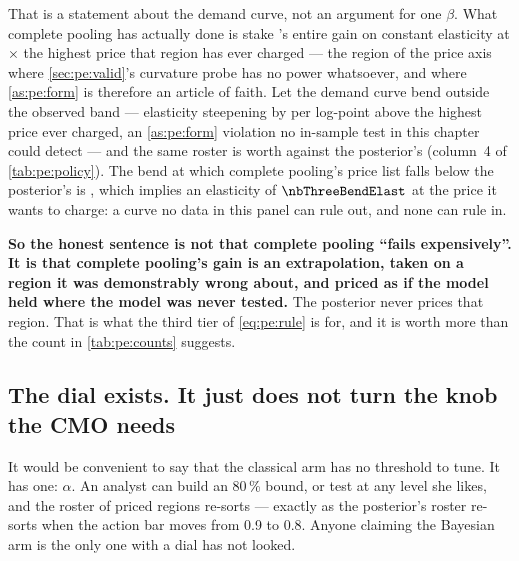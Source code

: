 That is a statement about the demand curve, not an argument for one $\beta$. What complete pooling
has actually done is stake \nbThreeInelasticRegion's entire gain on constant elasticity at
\nbThreeCpExtrap$\times$ the highest price that region has ever charged --- the region of the price
axis where \cref{sec:pe:valid}'s curvature probe has no power whatsoever, and where
\cref{as:pe:form} is therefore an article of faith. Let the demand curve bend outside the observed
band --- elasticity steepening by \nbThreeBendShow{} per log-point above the highest price ever
charged, an \cref{as:pe:form} violation no in-sample test in this chapter could detect --- and the
same roster is worth \pc{\nbThreePolicyValueCpBend} against the posterior's
\pc{\nbThreePolicyValuePpBend} (column~4 of \cref{tab:pe:policy}). The bend at which complete
pooling's price list falls below the posterior's is \nbThreeBendFlip, which implies an elasticity of
$\nbThreeBendElast$ at the price it wants to charge: a curve no data in this panel can rule out, and
none can rule in.

\textbf{So the honest sentence is not that complete pooling ``fails expensively''. It is that
complete pooling's gain is an extrapolation, taken on a region it was demonstrably wrong about, and
priced as if the model held where the model was never tested.} The posterior never prices that
region. That is what the third tier of \cref{eq:pe:rule} is for, and it is worth more than the count
in \cref{tab:pe:counts} suggests.

\subsection*{The dial exists. It just does not turn the knob the CMO needs}

It would be convenient to say that the classical arm has no threshold to tune. It has one:
$\alpha$. An analyst can build an 80\,\% bound, or test at any level she likes, and the roster of
priced regions re-sorts --- exactly as the posterior's roster re-sorts when the action bar moves
from 0.9 to 0.8. Anyone claiming the Bayesian arm is the only one with a dial has not looked.

